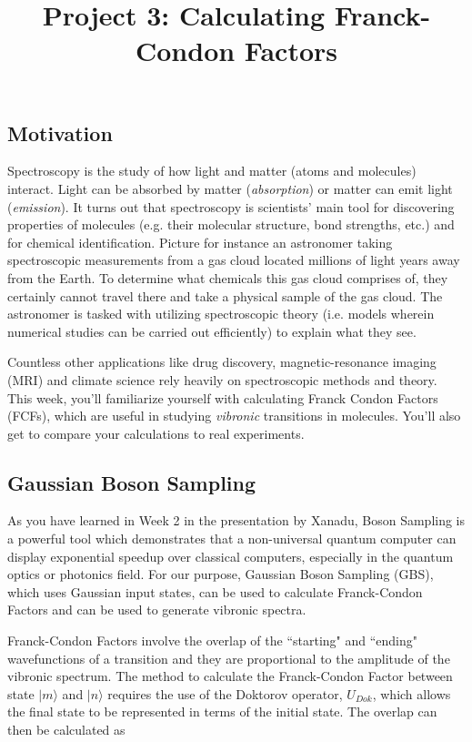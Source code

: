 \documentclass[12pt]{article}
\title{Project 3: Calculating Franck-Condon Factors}
\begin{document}
\maketitle

\thispagestyle{empty}

\subsection*{Motivation}

Spectroscopy is the study of how light and matter (atoms and molecules) interact.
Light can be absorbed by matter (\textit{absorption}) or matter can emit light (\textit{emission}).
It turns out that spectroscopy is scientists' main tool for discovering properties of molecules (e.g. their molecular structure, bond strengths, etc.) and for chemical identification. Picture for instance an astronomer taking spectroscopic measurements from a gas cloud located millions of light years away from the Earth. To determine what chemicals this gas cloud comprises of, they certainly cannot travel there and take a physical sample of the gas cloud. The astronomer is tasked with utilizing spectroscopic theory (i.e. models wherein numerical studies can be carried out efficiently) to explain what they see.

Countless other applications like drug discovery, magnetic-resonance imaging (MRI) and climate science rely heavily on spectroscopic methods and theory. This week, you'll familiarize yourself with calculating Franck Condon Factors (FCFs), which are useful in studying {\it vibronic} transitions in molecules. You'll also get to compare your calculations to real experiments.

\subsection*{Gaussian Boson Sampling}
As you have learned in Week 2 in the presentation by Xanadu, Boson Sampling is a powerful tool which demonstrates that a non-universal quantum computer can display exponential speedup over classical computers, especially in the quantum optics or photonics field\cite{huh2015boson,aaronson2011computational, harrow2017quantum, quesadaFranckCondonFactorsCounting2019}. For our purpose, Gaussian Boson Sampling (GBS), which uses Gaussian input states, can be used to calculate Franck-Condon Factors and can be used to generate vibronic spectra.

Franck-Condon Factors involve the overlap of the ``starting" and ``ending" wavefunctions of a transition and they are proportional to the amplitude of the vibronic spectrum. The method to calculate the Franck-Condon Factor between state $|m\rangle$ and $|n\rangle$ requires the use of the Doktorov operator, $U_{Dok}$, which allows the final state to be represented in terms of the initial state. The overlap can then be calculated as 
\end{document}
